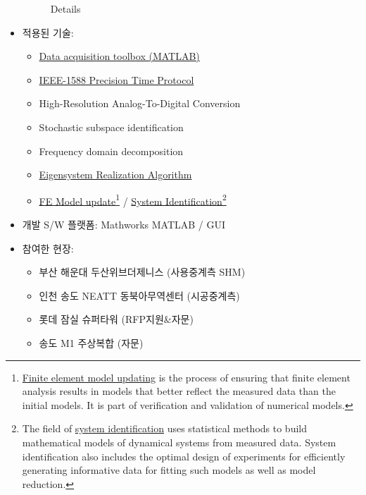 \documentclass[10pt,a4paper,ragged2e]{altacv}
\begin{document}
\begin{fullwidth}
\begin{itemize}
\begin{figure}[ht]
\begin{fullwidth}
{        \caption*{Details}
      }
    \end{fullwidth}
  \end{figure}
\item 적용된 기술:
  \begin{itemize}
 \item \href{http://kr.mathworks.com/products/daq/}{Data acquisition toolbox (MATLAB)}
 \item \href{https://ko.wikipedia.org/wiki/IEEE_1588}{IEEE-1588 Precision Time Protocol}
 \item High-Resolution Analog-To-Digital Conversion
 \item Stochastic subspace identification
 \item Frequency domain decomposition
 \item \href{https://en.wikipedia.org/wiki/Eigensystem_realization_algorithm}{Eigensystem Realization Algorithm}
 \item \href{https://en.wikipedia.org/wiki/Finite_element_updating}{FE Model update}\footnote{\href{https://en.wikipedia.org/wiki/Finite_element_updating}{Finite element model updating} is the process of ensuring that finite element analysis results in models that better reflect the measured data than the initial models. It is part of verification and validation of numerical models.} / \href{https://en.wikipedia.org/wiki/System_identification}{System Identification}\footnote{The field of \href{https://en.wikipedia.org/wiki/System_identification}{system identification} uses statistical methods to build mathematical models of dynamical systems from measured data. System identification also includes the optimal design of experiments for efficiently generating informative data for fitting such models as well as model reduction.}
  \end{itemize}
\item 개발 S/W 플랫폼: Mathworks MATLAB / GUI
\item 참여한 현장:
\begin{itemize}
  \item 부산 해운대 두산위브더제니스 (사용중계측 SHM)
  \item 인천 송도 NEATT 동북아무역센터 (시공중계측)
  \item 롯데 잠실 슈퍼타워 (RFP지원\&자문)
  \item 송도 M1 주상복합 (자문)
\end{itemize}
\end{itemize}

\divider


\end{fullwidth}
\end{document}
